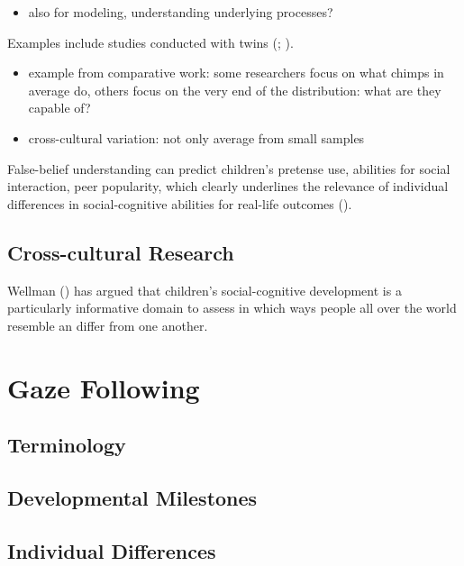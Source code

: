 \documentclass[
]{scrbook}
\providecommand{\tightlist}{%
  \setlength{\itemsep}{0pt}\setlength{\parskip}{0pt}}
\begin{document}
\begin{itemize}
\tightlist
\item
  also for modeling, understanding underlying processes?
\end{itemize}

Examples include studies conducted with twins (; ).

\begin{itemize}
\tightlist
\item
  example from comparative work: some researchers focus on what chimps in average do, others focus on the very end of the distribution: what are they capable of?
\item
  cross-cultural variation: not only average from small samples
\end{itemize}

False-belief understanding can predict children's pretense use, abilities for social interaction, peer popularity, which clearly underlines the relevance of individual differences in social-cognitive abilities for real-life outcomes ().

\subsection{Cross-cultural Research}\label{cross-cultural-research}

Wellman () has argued that children's social-cognitive development is a particularly informative domain to assess in which ways people all over the world resemble an differ from one another.

\section{Gaze Following}\label{gaze-following}

\subsection{Terminology}\label{terminology-1}

\subsection{Developmental Milestones}\label{developmental-milestones-1}

\subsection{Individual Differences}\label{individual-differences-1}
\end{document}

